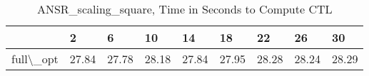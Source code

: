 \begin{table}
\centering
\caption{ANSR\_scaling\_square, Time in Seconds to Compute CTL}
\label{ANSR_scaling_square_CTL_time}
\begin{tabular}{lllllllll}
\toprule
{} &      2 &      6 &     10 &     14 &     18 &     22 &     26 &     30 \\
\midrule
full\textbackslash \_opt &  27.84 &  27.78 &  28.18 &  27.84 &  27.95 &  28.28 &  28.24 &  28.29 \\
\bottomrule
\end{tabular}
\end{table}
